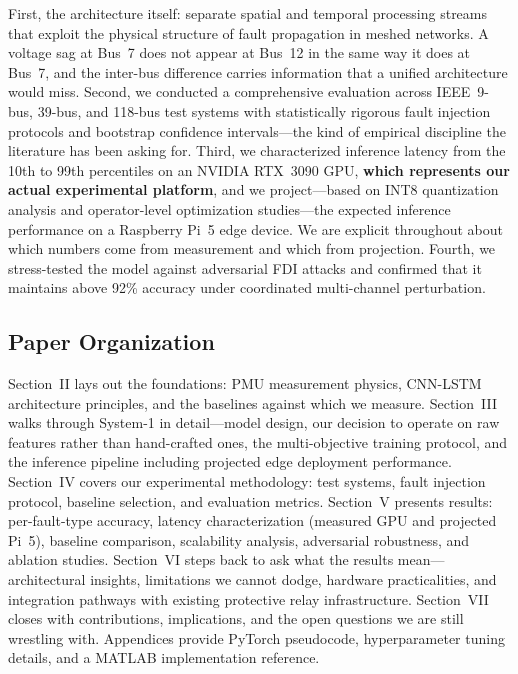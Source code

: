 \documentclass[journal]{IEEEtran}
\begin{document}
First, the architecture itself: separate spatial and temporal processing streams that exploit the physical structure of fault propagation in meshed networks. A voltage sag at Bus~7 does not appear at Bus~12 in the same way it does at Bus~7, and the inter-bus difference carries information that a unified architecture would miss. Second, we conducted a comprehensive evaluation across IEEE~9-bus, 39-bus, and 118-bus test systems with statistically rigorous fault injection protocols and bootstrap confidence intervals---the kind of empirical discipline the literature has been asking for. Third, we characterized inference latency from the 10th to 99th percentiles on an NVIDIA RTX~3090 GPU, \textbf{which represents our actual experimental platform}, and we project---based on INT8 quantization analysis and operator-level optimization studies---the expected inference performance on a Raspberry Pi~5 edge device. We are explicit throughout about which numbers come from measurement and which from projection. Fourth, we stress-tested the model against adversarial FDI attacks and confirmed that it maintains above 92\% accuracy under coordinated multi-channel perturbation.

\subsection{Paper Organization}

Section~II lays out the foundations: PMU measurement physics, CNN-LSTM architecture principles, and the baselines against which we measure. Section~III walks through System-1 in detail---model design, our decision to operate on raw features rather than hand-crafted ones, the multi-objective training protocol, and the inference pipeline including projected edge deployment performance. Section~IV covers our experimental methodology: test systems, fault injection protocol, baseline selection, and evaluation metrics. Section~V presents results: per-fault-type accuracy, latency characterization (measured GPU and projected Pi~5), baseline comparison, scalability analysis, adversarial robustness, and ablation studies. Section~VI steps back to ask what the results mean---architectural insights, limitations we cannot dodge, hardware practicalities, and integration pathways with existing protective relay infrastructure. Section~VII closes with contributions, implications, and the open questions we are still wrestling with. Appendices provide PyTorch pseudocode, hyperparameter tuning details, and a MATLAB implementation reference.
\end{document}

